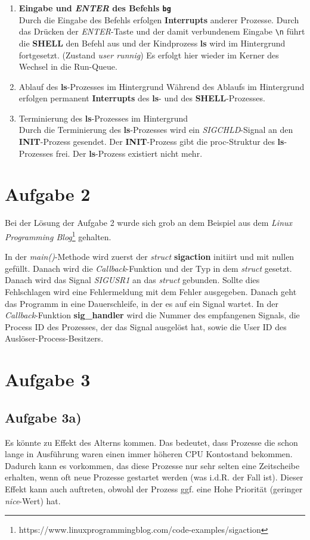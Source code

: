 \documentclass{ti2}
\begin{document}
\begin{enumerate}
	\item \textbf{Eingabe und \textit{ENTER} des Befehls \texttt{bg}}\\
	Durch die Eingabe des Befehls erfolgen \textbf{Interrupts} anderer Prozesse. Durch das Drücken der \textit{ENTER}-Taste und der damit verbundenem Eingabe \texttt{\textbackslash n} führt die \textbf{SHELL} den Befehl aus und der Kindprozess \textbf{ls} wird im Hintergrund fortgesetzt. (Zustand \textit{user runnig}) Es erfolgt hier wieder im Kerner des Wechsel in die Run-Queue.
	\item Ablauf des \textbf{ls}-Prozesses im Hintergrund
	Während des Ablaufs im Hintergrund erfolgen permanent \textbf{Interrupts} des \textbf{ls}- und des \textbf{SHELL}-Prozesses.
	\item Terminierung des \textbf{ls}-Prozesses im Hintergrund\\
	Durch die Terminierung des \textbf{ls}-Prozesses wird ein \textit{SIGCHLD}-Signal an den \textbf{INIT}-Prozess gesendet. Der \textbf{INIT}-Prozess gibt die proc-Struktur des \textbf{ls}-Prozesses frei. Der \textbf{ls}-Prozess existiert nicht mehr.
\end{enumerate}

\newpage
\section*{Aufgabe 2}
Bei der Lösung der Aufgabe 2 wurde sich grob an dem Beispiel aus dem \textit{Linux Programming Blog}\footnote{https://www.linuxprogrammingblog.com/code-examples/sigaction} gehalten.

In der \textit{main()}-Methode wird zuerst der \textit{struct} \textbf{sigaction} initiirt und mit nullen gefüllt. Danach wird die \textit{Callback}-Funktion und der Typ in dem \textit{struct} gesetzt. Danach wird das Signal \textit{SIGUSR1} an das \textit{struct} gebunden. Sollte dies Fehlschlagen wird eine Fehlermeldung mit dem Fehler ausgegeben. Danach geht das Programm in eine Dauerschleife, in der es auf ein Signal wartet. In der \textit{Callback}-Funktion \textbf{sig\_handler} wird die Nummer des empfangenen Signals, die Process ID des Prozesses, der das Signal ausgelöst hat, sowie die User ID des Auslöser-Process-Besitzers.
\section*{Aufgabe 3}
\subsection*{Aufgabe 3a)}
Es könnte zu Effekt des Alterns kommen. Das bedeutet, dass Prozesse die schon lange in Ausführung waren einen immer höheren CPU Kontostand bekommen. Dadurch kann es vorkommen, das diese Prozesse nur sehr selten eine Zeitscheibe erhalten, wenn oft neue Prozesse gestartet werden (was i.d.R. der Fall ist). Dieser Effekt kann auch auftreten, obwohl der Prozess ggf. eine Hohe Priorität (geringer \textit{nice}-Wert) hat. 
\end{document}
